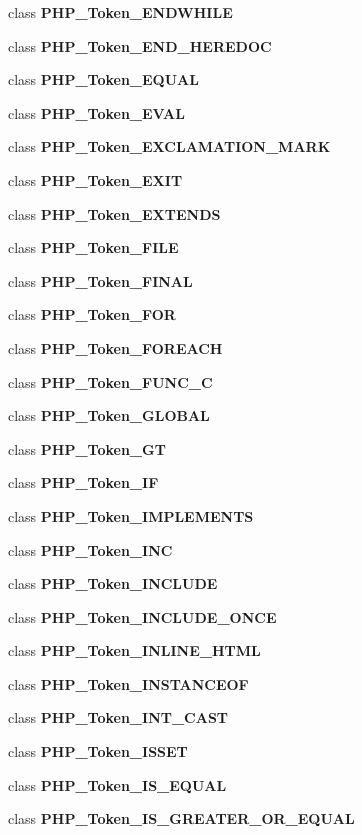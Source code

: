 \begin{DoxyCompactItemize}
class {\bf P\+H\+P\+\_\+\+Token\+\_\+\+E\+N\+D\+W\+H\+I\+L\+E}
\item 
class {\bf P\+H\+P\+\_\+\+Token\+\_\+\+E\+N\+D\+\_\+\+H\+E\+R\+E\+D\+O\+C}
\item 
class {\bf P\+H\+P\+\_\+\+Token\+\_\+\+E\+Q\+U\+A\+L}
\item 
class {\bf P\+H\+P\+\_\+\+Token\+\_\+\+E\+V\+A\+L}
\item 
class {\bf P\+H\+P\+\_\+\+Token\+\_\+\+E\+X\+C\+L\+A\+M\+A\+T\+I\+O\+N\+\_\+\+M\+A\+R\+K}
\item 
class {\bf P\+H\+P\+\_\+\+Token\+\_\+\+E\+X\+I\+T}
\item 
class {\bf P\+H\+P\+\_\+\+Token\+\_\+\+E\+X\+T\+E\+N\+D\+S}
\item 
class {\bf P\+H\+P\+\_\+\+Token\+\_\+\+F\+I\+L\+E}
\item 
class {\bf P\+H\+P\+\_\+\+Token\+\_\+\+F\+I\+N\+A\+L}
\item 
class {\bf P\+H\+P\+\_\+\+Token\+\_\+\+F\+O\+R}
\item 
class {\bf P\+H\+P\+\_\+\+Token\+\_\+\+F\+O\+R\+E\+A\+C\+H}
\item 
class {\bf P\+H\+P\+\_\+\+Token\+\_\+\+F\+U\+N\+C\+\_\+\+C}
\item 
class {\bf P\+H\+P\+\_\+\+Token\+\_\+\+G\+L\+O\+B\+A\+L}
\item 
class {\bf P\+H\+P\+\_\+\+Token\+\_\+\+G\+T}
\item 
class {\bf P\+H\+P\+\_\+\+Token\+\_\+\+I\+F}
\item 
class {\bf P\+H\+P\+\_\+\+Token\+\_\+\+I\+M\+P\+L\+E\+M\+E\+N\+T\+S}
\item 
class {\bf P\+H\+P\+\_\+\+Token\+\_\+\+I\+N\+C}
\item 
class {\bf P\+H\+P\+\_\+\+Token\+\_\+\+I\+N\+C\+L\+U\+D\+E}
\item 
class {\bf P\+H\+P\+\_\+\+Token\+\_\+\+I\+N\+C\+L\+U\+D\+E\+\_\+\+O\+N\+C\+E}
\item 
class {\bf P\+H\+P\+\_\+\+Token\+\_\+\+I\+N\+L\+I\+N\+E\+\_\+\+H\+T\+M\+L}
\item 
class {\bf P\+H\+P\+\_\+\+Token\+\_\+\+I\+N\+S\+T\+A\+N\+C\+E\+O\+F}
\item 
class {\bf P\+H\+P\+\_\+\+Token\+\_\+\+I\+N\+T\+\_\+\+C\+A\+S\+T}
\item 
class {\bf P\+H\+P\+\_\+\+Token\+\_\+\+I\+S\+S\+E\+T}
\item 
class {\bf P\+H\+P\+\_\+\+Token\+\_\+\+I\+S\+\_\+\+E\+Q\+U\+A\+L}
\item 
class {\bf P\+H\+P\+\_\+\+Token\+\_\+\+I\+S\+\_\+\+G\+R\+E\+A\+T\+E\+R\+\_\+\+O\+R\+\_\+\+E\+Q\+U\+A\+L}

\end{DoxyCompactItemize}
